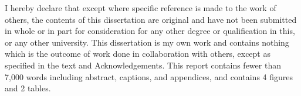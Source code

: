 
\begin{declaration}

I hereby declare that except where specific reference is made to the work of 
others, the contents of this dissertation are original and have not been 
submitted in whole or in part for consideration for any other degree or 
qualification in this, or any other university. This dissertation is my own 
work and contains nothing which is the outcome of work done in collaboration 
with others, except as specified in the text and Acknowledgements. This 
report contains fewer than 7,000 words including abstract, captions, and
appendices, and contains 4 figures and 2 tables.


\end{declaration}

